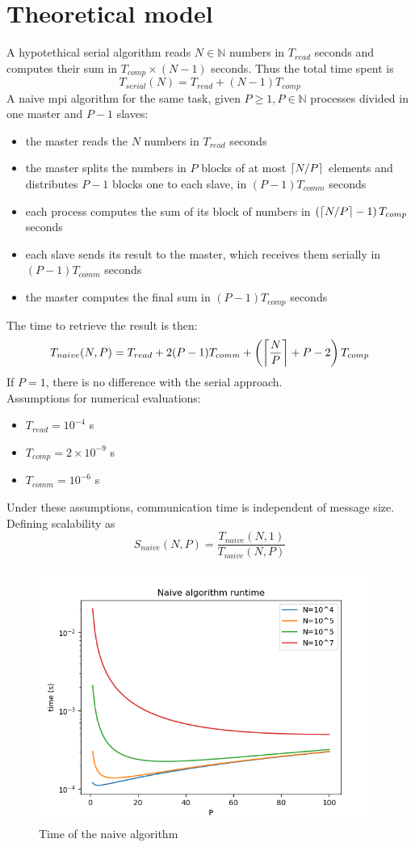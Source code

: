 \documentclass[a4paper, 11pt, twoside, openright]{article}
\DeclarePairedDelimiter{\ceil}{\lceil}{\rceil}
\begin{document}
\section{Theoretical model}
A hypotethical serial algorithm reads $N \in \mathbb{N}$ numbers in $T_{read}$ seconds and computes their sum in $T_{comp} \times (N-1)$ seconds. Thus the total time spent is
$$T_{serial}(N) = T_{read} + (N-1)T_{comp}$$
A naive mpi algorithm for the same task, given $P \geq 1, P \in \mathbb{N}$ processes divided in one master and $P-1$ slaves:
\begin{itemize}
\item the master reads the $N$ numbers in $T_{read}$ seconds
\item the master splits the numbers in $P$ blocks of at most $\ceil{N/P}$ elements and distributes $P-1$ blocks one to each slave, in $(P-1)T_{comm}$ seconds
\item each process computes the sum of its block of numbers in $\left(\ceil{N/P}-1\right)T_{comp}$ seconds
\item each slave sends its result to the master, which receives them serially in $(P-1)T_{comm}$ seconds
\item the master computes the final sum in $(P-1)T_{comp}$ seconds
\end{itemize}
The time to retrieve the result is then:
$$T_{naive}(N, P) = T_{read} + 2(P-1)T_{comm} + \left(\ceil[\bigg]{\frac{N}{P}}+P-2\right)T_{comp}$$
If $P=1$, there is no difference with the serial approach.\\
Assumptions for numerical evaluations:
\begin{itemize}
\item $T_{read} = 10^{-4}$ s
\item $T_{comp} = 2 \times 10^{-9}$ s
\item $T_{comm} = 10^{-6}$ s
\end{itemize}
Under these assumptions, communication time is independent of message size.\\
Defining scalability as
$$S_{naive}(N, P) = \frac{T_{naive}(N, 1)}{T_{naive}(N, P)}$$
\begin{figure}[h]
    \includegraphics[width=11cm]{theoretical_naive_time}
    \caption{Time of the naive algorithm}
\end{figure}
\end{document}
